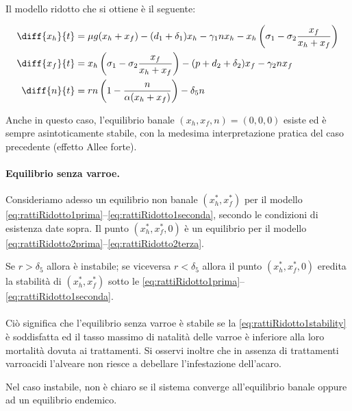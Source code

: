 \paragraph{}
Il modello ridotto che si ottiene è il seguente:

\begin{align}
    \diff{x_h}{t} &= \mu g( x_h + x_f ) - (d_1 + \delta_1) x_h - \gamma_1 n x_h
        - x_h \left( \sigma_1 - \sigma_2 \frac{x_f}{x_h + x_f} \right)
        \label{eq:rattiRidotto2prima}
    \\
    \diff{x_f}{t} &= x_h \left( \sigma_1 - \sigma_2 \frac{x_f}{x_h + x_f} \right) - (p + d_2 + \delta_2) x_f
        - \gamma_2 n x_f
        \label{eq:rattiRidotto2seconda}
    \\
    \diff{n}{t} &= rn \left( 1 - \frac{n}{ \alpha (x_h + x_f) } \right) - \delta_5 n
        \label{eq:rattiRidotto2terza}
\end{align}

Anche in questo caso, l'equilibrio banale $(x_h, x_f, n)=(0,0,0)$ esiste ed è sempre asintoticamente stabile, con la medesima interpretazione pratica del caso precedente (effetto Allee forte).

\paragraph{Equilibrio senza varroe. } Consideriamo adesso un equilibrio non banale $(x_h^*, x_f^*)$ per il modello \eqref{eq:rattiRidotto1prima}--\eqref{eq:rattiRidotto1seconda}, secondo le condizioni di esistenza date sopra.
Il punto $(x_h^*, x_f^*, 0)$ è un equilibrio per il modello \eqref{eq:rattiRidotto2prima}--\eqref{eq:rattiRidotto2terza}.

Se $r > \delta_5$ allora è instabile; se viceversa $r< \delta_5$ allora il punto $(x_h^*, x_f^*, 0)$ eredita la stabilità di $(x_h^*, x_f^*)$ sotto le \eqref{eq:rattiRidotto1prima}--\eqref{eq:rattiRidotto1seconda}.

\paragraph{}
Ciò significa che l'equilibrio senza varroe è stabile se la \eqref{eq:rattiRidotto1stability} è soddisfatta
ed il tasso massimo di natalità delle varroe è inferiore alla loro mortalità dovuta ai trattamenti.
Si osservi inoltre che in assenza di trattamenti varroacidi l'alveare non riesce a debellare l'infestazione dell'acaro.

Nel caso instabile, non è chiaro se il sistema converge all'equilibrio banale oppure ad un equilibrio endemico. \cite[15]{ratti2017}


